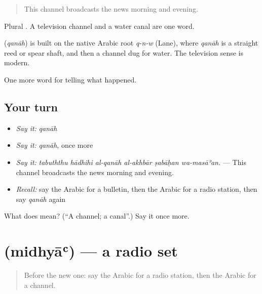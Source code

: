 \begin{quote}
This channel broadcasts the news morning and evening.
\end{quote}

Plural . A television channel and a water canal are one word.

\begin{cousinweb}
\textbf{} (\emph{qanāh}) is built on the native Arabic root \emph{q-n-w} (Lane), where \emph{qanāh} is a straight reed or spear shaft, and then a channel dug for water. The television sense is modern.
\end{cousinweb}

\begin{grammarlens}[title={What you've built}]
One more word for telling what happened.
\end{grammarlens}

\subsection*{Your turn}
\begin{itemize}
\raggedright
  \item \emph{Say it:} \emph{qanāh}
  \item \emph{Say it:} \emph{qanāh}, once more
  \item \emph{Say it:} \emph{tabuththu hādhihi al-qanāh al-akhbār ṣabāḥan wa-masāʾan.} — This channel broadcasts the news morning and evening.
  \item \emph{Recall:} say the Arabic for a bulletin, then the Arabic for a radio station, then say \emph{qanāh} again
\end{itemize}

\begin{tcolorbox}[breakable,colback=teal!4,colframe=teal!35!black,title={Before you move on}]
What does  mean? (\textquotedblleft{}A channel; a canal\textquotedblright{}.) Say it once more.
\end{tcolorbox}
\section[\texorpdfstring{\ar{مذياع} (midhyāʿ)}{مذياع (midhyāʿ)}]{ (midhyāʿ) — a radio set}

\label{lesson:AR-C297-midhya}



\begin{quote}
Before the new one: say the Arabic for a radio station, then the Arabic for a channel.
\end{quote}

